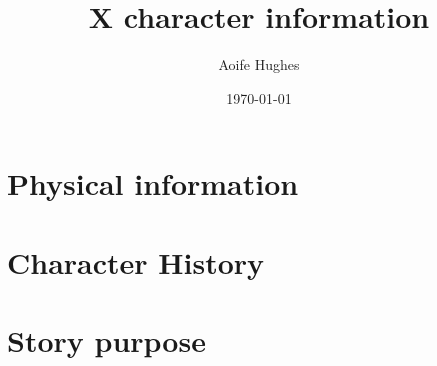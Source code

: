 \documentclass[11pt]{article}
\title{X character information}
\author{Aoife Hughes }
\date{\today}
\begin{document}
\maketitle	
\pagebreak


\section{Physical information}

\section{Character History}

\section{Story purpose}
\end{document}
